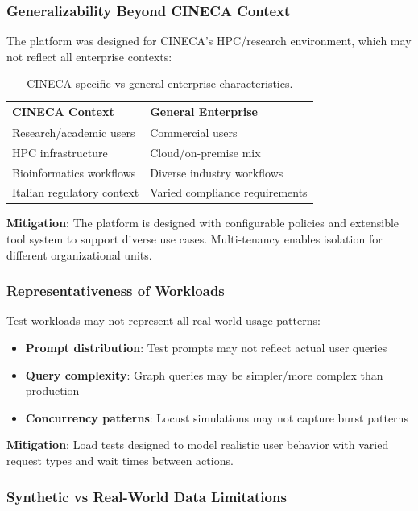 \subsubsection{Generalizability Beyond CINECA Context}

The platform was designed for CINECA's HPC/research environment, which may not reflect all enterprise contexts:

\begin{table}[ht]
\centering
\caption{CINECA-specific vs general enterprise characteristics.}
\label{tab:cineca-vs-enterprise}
\small
\begin{tabular}{ll}
\hline
\textbf{CINECA Context} & \textbf{General Enterprise} \\
\hline
Research/academic users & Commercial users \\
HPC infrastructure & Cloud/on-premise mix \\
Bioinformatics workflows & Diverse industry workflows \\
Italian regulatory context & Varied compliance requirements \\
\hline
\end{tabular}
\end{table}

\textbf{Mitigation}: The platform is designed with configurable policies and extensible tool system to support diverse use cases. Multi-tenancy enables isolation for different organizational units.

\subsubsection{Representativeness of Workloads}

Test workloads may not represent all real-world usage patterns:

\begin{itemize}
    \item \textbf{Prompt distribution}: Test prompts may not reflect actual user queries
    \item \textbf{Query complexity}: Graph queries may be simpler/more complex than production
    \item \textbf{Concurrency patterns}: Locust simulations may not capture burst patterns
\end{itemize}

\textbf{Mitigation}: Load tests designed to model realistic user behavior with varied request types and wait times between actions.

\subsubsection{Synthetic vs Real-World Data Limitations}

